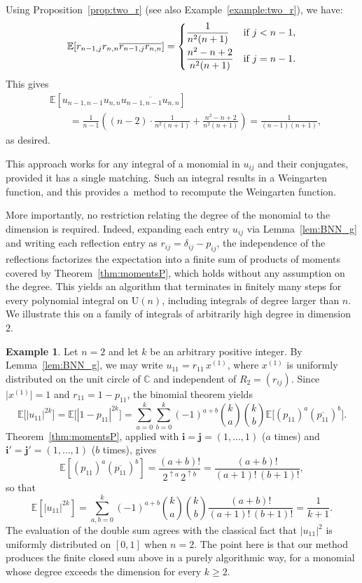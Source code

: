\documentclass[10pt,a4paper]{amsart}
\numberwithin{equation}{section}
\theoremstyle{definition}
\newtheorem{Example}[Theorem]{Example}
\newcommand{\UU}{\mathrm{U}}
\begin{document}
Using Proposition~\ref{prop:two_r} (see also Example~\ref{example:two_r}), we have:
\[
\mathbb{E} [r_{n-1,j} r_{n,n} \overline{r_{n-1,j} r_{n,n}}] =
\begin{cases}
 \dfrac{1}{n^2(n+1)} & \text{if $j <n-1$}, \vspace{1mm}\\
 \dfrac{n^2-n+2}{n^2(n+1)} & \text{if $j =n-1$}.
\end{cases}
\]
This gives
\begin{align*}
&\mathbb{E} [ u_{n-1,n-1} u_{n,n} \overline{u_{n-1,n-1} u_{n, n}} ]\\
& \qquad
= \frac{1}{n-1} \left( (n-2) \cdot \frac{1}{n^2(n+1)} + \frac{n^2-n+2}{n^2(n+1)}
\right) = \frac{1}{(n-1)(n+1)},
\end{align*}
as desired.

This approach works for any integral of a monomial in $u_{ij}$ and their conjugates,
provided it has a single matching.
Such an integral results in a Weingarten function, and this provides a~method to recompute the Weingarten function.

More importantly, no restriction relating the degree of the monomial to the dimension is required.
Indeed, expanding each entry $u_{ij}$ via Lemma~\ref{lem:BNN_g} and writing each reflection entry as $r_{ij}= \delta_{ij}-p_{ij}$, the independence of the reflections factorizes the expectation into a finite sum of products of moments covered by Theorem~\ref{thm:momentsP}, which holds without any assumption on the degree.
This yields an algorithm that terminates in finitely many steps for every polynomial integral on $\UU(n)$, including integrals of degree larger than $n$.
We illustrate this on a family of integrals of arbitrarily high degree in dimension $2$.

\begin{Example} \label{ex:U2_high_degree}
Let $n=2$ and let $k$ be an arbitrary positive integer.
By Lemma~\ref{lem:BNN_g}, we may write $u_{11}=r_{11}\, x^{(1)}$, where $x^{(1)}$ is uniformly distributed on the unit circle of $\mathbb{C}$ and independent of $R_2=(r_{ij})$.
Since $\bigl|x^{(1)}\bigr|=1$ and $r_{11}=1-p_{11}$, the binomial theorem yields
\[
\mathbb{E}\bigl[|u_{11}|^{2k}\bigr] = \mathbb{E}\bigl[|1-p_{11}|^{2k}\bigr]
= \sum_{a=0}^{k} \sum_{b=0}^{k} (-1)^{a+b} \binom{k}{a} \binom{k}{b} \mathbb{E}\bigl[(p_{11})^a (\overline{p_{11}})^b\bigr].
\]
Theorem~\ref{thm:momentsP}, applied with $\bm{i}=\bm{j}=(1,\dots,1)$ ($a$ times) and $\bm{i}'=\bm{j}'=(1,\dots,1)$ ($b$ times), gives
\[
\mathbb{E}\left[(p_{11})^a (\overline{p_{11}})^b\right] = \frac{(a+b)!}{2^{\uparrow a}\, 2^{\uparrow b}} = \frac{(a+b)!}{(a+1)!\,(b+1)!},
\]
so that
\[
\mathbb{E}\left[|u_{11}|^{2k}\right] = \sum_{a,b=0}^{k} (-1)^{a+b} \binom{k}{a}\binom{k}{b} \frac{(a+b)!}{(a+1)!\,(b+1)!} = \frac{1}{k+1}.
\]
The evaluation of the double sum agrees with the classical fact that $|u_{11}|^2$ is uniformly distributed on $[0,1]$ when $n=2$.
The point here is that our method produces the finite closed sum above in a purely algorithmic way, for a monomial whose degree exceeds the dimension for every $k \ge 2$.
\end{Example}
\end{document}
